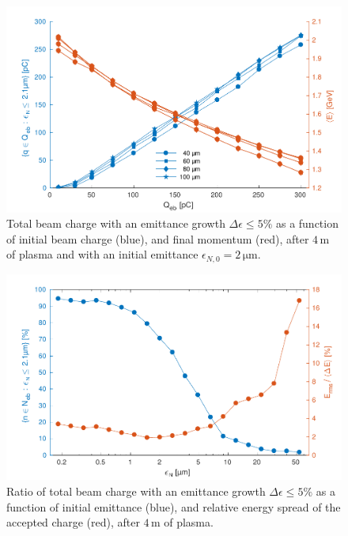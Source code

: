 \documentclass[aps,prstab,reprint,amsmath,amssymb,groupedaddress]{revtex4-1}
\newcommand{\unit}[1]{\,\mathrm{#1}}
\begin{document}
\begin{figure}[hbt]
    \includegraphics[width=\linewidth,trim={2mm 0mm 2mm 0mm},clip]{figures/beamQualityAbs}
    \caption{\label{Fig:BeamQAbs} Total beam charge with an emittance growth $\Delta\epsilon \leq 5\%$ as a function of
        initial beam charge (blue), and final momentum (red), after $4\unit{m}$ of plasma and with an initial emittance
        $\epsilon_{N,0}=2\unit{\mu m}$.}
\end{figure}

\begin{figure}[hbt]
    \includegraphics[width=\linewidth,trim={2mm 0mm 2mm 0mm},clip]{figures/beamQualityEmittance}
    \caption{\label{Fig:BeamQEmit} Ratio of total beam charge with an emittance growth $\Delta\epsilon \leq 5\%$ as a
        function of initial emittance (blue), and relative energy spread of the accepted charge (red), after $4\unit{m}$
        of plasma.}
\end{figure}

\end{document}
